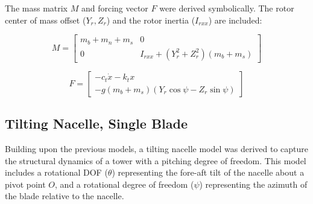 \documentclass[onecolumn,draftcls]{IEEEtran}
\begin{document}
The mass matrix $M$ and forcing vector $F$ were derived symbolically. The rotor center of mass offset ($Y_r, Z_r$) and the rotor inertia ($I_{rxx}$) are included:

\begin{equation}
    \label{eq:cart_mass_matrix} M =
    \begin{bmatrix}
        m_b + m_n + m_s & 0 \\
        0 & I_{rxx} + (Y_{r}^{2} + Z_{r}^{2}) (m_b + m_s)
    \end{bmatrix}
\end{equation}

\begin{equation} 
    \label{eq:cart_forcing_terms} F =
    \begin{bmatrix}
        - c_{t} \dot{x} - k_{t} x \\
        - g (m_b + m_s) (Y_{r} \cos\psi - Z_{r} \sin\psi)
    \end{bmatrix} 
\end{equation}

\subsection*{Tilting Nacelle, Single Blade}
Building upon the previous models, a tilting nacelle model was derived to capture the structural dynamics of a tower with a pitching degree of freedom. This model includes a rotational DOF ($\theta$) representing the fore-aft tilt of the nacelle about a pivot point $O$, and a rotational degree of freedom ($\psi$) representing the azimuth of the blade relative to the nacelle.
\end{document}
